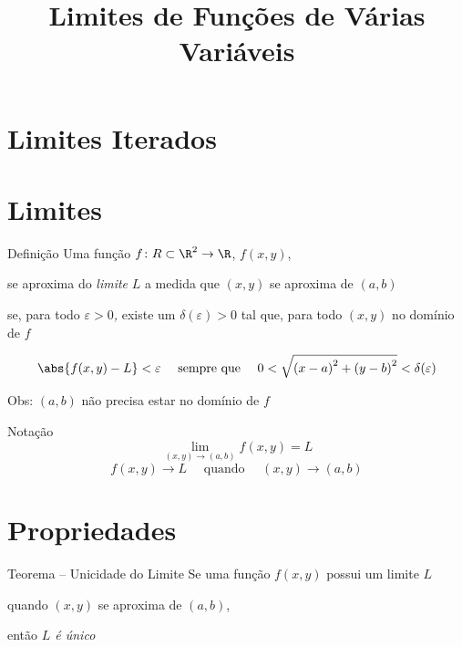 \documentclass[fleqn,utf8,aspectratio=169,12pt]{beamer}
\title{Limites de Funções de Várias Variáveis}
\begin{document}
\addtitle

\section{Limites Iterados}



\section{Limites}

\begin{frame}{Definição}
  Uma função
  \(f\colon R \subset \R^2 \to \R\), \;
  \pause
  \(f(x, y)\),

  \pause
  se aproxima do \emph{limite} $L$
  a medida que \((x, y)\) se aproxima de \((a, b)\)

  \pause
  se, para todo \emph{$\varepsilon>0$,}
  \pause
  existe um \emph{\(\delta(\varepsilon)>0\)}
  \pause
  tal que,
  \pause
  para todo \((x, y)\) no domínio de $f$

  \pause
  \[
    \abs{f(x, y)-L} < \varepsilon
    \quad\text{ sempre que }\quad
    0 < \sqrt{ \left(x-a\right)^2 + \left(y-b\right)^2 } < \delta(\varepsilon)
  \]

  \pause
  Obs: \((a, b)\) não precisa estar no domínio de $f$
\end{frame}

\begin{frame}{Notação}
  \[
    \lim_{(x, y)\to(a, b)} f(x, y) = L
  \]
  \pause
  \vspace{\baselineskip}
  \[
    f(x, y) \to L \quad\text{ quando }\quad (x, y)\to(a, b)
  \]
\end{frame}



\section{Propriedades}

\begin{frame}{Teorema -- Unicidade do Limite}
  Se uma função \(f(x, y)\) possui um limite $L$

  quando \((x, y)\) se aproxima de \((a, b)\),

  \pause
  então \emph{$L$ é único}
\end{frame}
\end{document}
